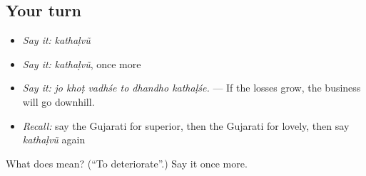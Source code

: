 \subsection*{Your turn}
\begin{itemize}
\raggedright
  \item \emph{Say it:} \emph{kathaḷvũ}
  \item \emph{Say it:} \emph{kathaḷvũ}, once more
  \item \emph{Say it:} \emph{jo khoṭ vadhśe to dhandho kathaḷśe.} — If the losses grow, the business will go downhill.
  \item \emph{Recall:} say the Gujarati for superior, then the Gujarati for lovely, then say \emph{kathaḷvũ} again
\end{itemize}

\begin{tcolorbox}[breakable,colback=teal!4,colframe=teal!35!black,title={Before you move on}]
What does  mean? (\textquotedblleft{}To deteriorate\textquotedblright{}.) Say it once more.
\end{tcolorbox}
